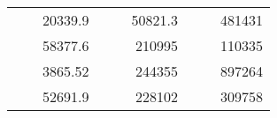 \begin{table}[]
\begin{tabular}{|ccrccrccc}
\rowcolor[HTML]{DDFDFF} 
\multicolumn{1}{|c|}{\cellcolor[HTML]{FFFFC7}}                                & \multicolumn{1}{c|}{\cellcolor[HTML]{DDFDFF}}                      & \multicolumn{1}{r|}{\cellcolor[HTML]{DAE8FC}20339.9}   & \multicolumn{1}{c|}{\cellcolor[HTML]{FFFFC7}}                                & \multicolumn{1}{c|}{\cellcolor[HTML]{DDFDFF}}                       & \multicolumn{1}{r|}{\cellcolor[HTML]{DDFDFF}50821.3}   & \multicolumn{1}{c|}{\cellcolor[HTML]{FFFFC7}}                                & \multicolumn{1}{c|}{\cellcolor[HTML]{DDFDFF}}                      & \multicolumn{1}{r|}{\cellcolor[HTML]{DDFDFF}481431}    \\ \cline{3-3} \cline{6-6} \cline{9-9} 
\multicolumn{1}{|c|}{\cellcolor[HTML]{FFFFC7}}                                & \multicolumn{1}{c|}{\cellcolor[HTML]{DDFDFF}}                      & \multicolumn{1}{r|}{\cellcolor[HTML]{DDFDFF}58377.6}   & \multicolumn{1}{c|}{\cellcolor[HTML]{FFFFC7}}                                & \multicolumn{1}{c|}{\cellcolor[HTML]{DDFDFF}}                       & \multicolumn{1}{r|}{\cellcolor[HTML]{DAE8FC}210995}    & \multicolumn{1}{c|}{\cellcolor[HTML]{FFFFC7}}                                & \multicolumn{1}{c|}{\cellcolor[HTML]{DDFDFF}}                      & \multicolumn{1}{r|}{\cellcolor[HTML]{DAE8FC}110335}    \\ \cline{3-3} \cline{6-6} \cline{9-9} 
\rowcolor[HTML]{DDFDFF} 
\multicolumn{1}{|c|}{\cellcolor[HTML]{FFFFC7}}                                & \multicolumn{1}{c|}{\cellcolor[HTML]{DDFDFF}}                      & \multicolumn{1}{r|}{\cellcolor[HTML]{DAE8FC}3865.52}   & \multicolumn{1}{c|}{\cellcolor[HTML]{FFFFC7}}                                & \multicolumn{1}{c|}{\cellcolor[HTML]{DDFDFF}}                       & \multicolumn{1}{r|}{\cellcolor[HTML]{DDFDFF}244355}    & \multicolumn{1}{c|}{\cellcolor[HTML]{FFFFC7}}                                & \multicolumn{1}{c|}{\cellcolor[HTML]{DDFDFF}}                      & \multicolumn{1}{r|}{\cellcolor[HTML]{DDFDFF}897264}    \\ \cline{3-3} \cline{6-6} \cline{9-9} 
\multicolumn{1}{|c|}{\cellcolor[HTML]{FFFFC7}}                                & \multicolumn{1}{c|}{\cellcolor[HTML]{DDFDFF}}                      & \multicolumn{1}{r|}{\cellcolor[HTML]{DDFDFF}52691.9}   & \multicolumn{1}{c|}{\cellcolor[HTML]{FFFFC7}}                                & \multicolumn{1}{c|}{\cellcolor[HTML]{DDFDFF}}                       & \multicolumn{1}{r|}{\cellcolor[HTML]{DAE8FC}228102}    & \multicolumn{1}{c|}{\cellcolor[HTML]{FFFFC7}}                                & \multicolumn{1}{c|}{\cellcolor[HTML]{DDFDFF}}                      & \multicolumn{1}{r|}{\cellcolor[HTML]{DAE8FC}309758}    \\ \cline{3-3} \cline{6-6} \cline{9-9} 

\end{tabular}
\end{table}
